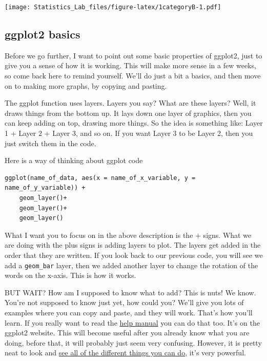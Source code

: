 \documentclass[
]{book}
\begin{document}
\texttt{[image: Statistics\_Lab\_files/figure-latex/1categoryB-1.pdf]}

\hypertarget{ggplot2-basics}{%
\subsection{ggplot2 basics}\label{ggplot2-basics}}

Before we go further, I want to point out some basic properties of ggplot2, just to give you a sense of how it is working. This will make more sense in a few weeks, so come back here to remind yourself. We'll do just a bit a basics, and then move on to making more graphs, by copying and pasting.

The ggplot function uses layers. Layers you say? What are these layers? Well, it draws things from the bottom up. It lays down one layer of graphics, then you can keep adding on top, drawing more things. So the idea is something like: Layer 1 + Layer 2 + Layer 3, and so on. If you want Layer 3 to be Layer 2, then you just switch them in the code.

Here is a way of thinking about ggplot code

\begin{verbatim}
ggplot(name_of_data, aes(x = name_of_x_variable, y = name_of_y_variable)) +
    geom_layer()+
    geom_layer()+
    geom_layer()
\end{verbatim}

What I want you to focus on in the above description is the \(+\) signs. What we are doing with the plus signs is adding layers to plot. The layers get added in the order that they are written. If you look back to our previous code, you will see we add a \texttt{geom\_bar} layer, then we added another layer to change the rotation of the words on the x-axis. This is how it works.

BUT WAIT? How am I supposed to know what to add? This is nuts! We know. You're not supposed to know just yet, how could you? We'll give you lots of examples where you can copy and paste, and they will work. That's how you'll learn. If you really want to read the \href{https://ggplot2.tidyverse.org/reference/index.html}{help manual} you can do that too. It's on the ggplot2 website. This will become useful after you already know what you are doing, before that, it will probably just seem very confusing. However, it is pretty neat to look and \href{http://www.ggplot2-exts.org/gallery/}{see all of the different things you can do}, it's very powerful.
\end{document}
